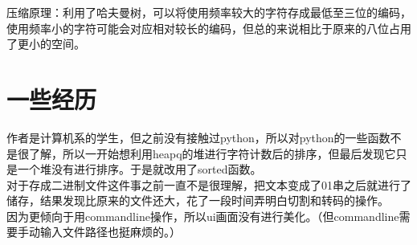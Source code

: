\documentclass[UTF8]{ctexart}
\begin{document}
压缩原理：利用了哈夫曼树，可以将使用频率较大的字符存成最低至三位的编码，使用频率小的字符可能会对应相对较长的编码，但总的来说相比于原来的八位占用了更小的空间。

\section{一些经历}
作者是计算机系的学生，但之前没有接触过python，所以对python的一些函数不是很了解，所以一开始想利用heapq的堆进行字符计数后的排序，但最后发现它只是一个堆没有进行排序。于是就改用了sorted函数。\\
\indent 对于存成二进制文件这件事之前一直不是很理解，把文本变成了01串之后就进行了储存，结果发现比原来的文件还大，花了一段时间弄明白切割和转码的操作。\\
\indent 因为更倾向于用commandline操作，所以ui画面没有进行美化。（但commandline需要手动输入文件路径也挺麻烦的。）
\end{document}
